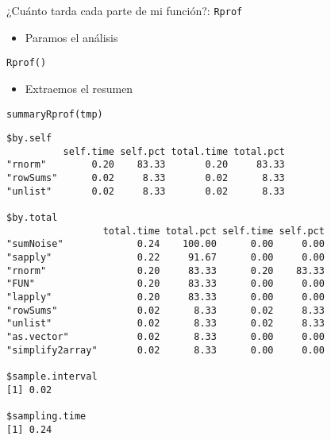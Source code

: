 \documentclass[xcolor={usenames,svgnames,dvipsnames}]{beamer}
\begin{document}
\begin{frame}[fragile,label={sec:orgheadline26}]{¿Cuánto tarda cada parte de mi función?: \texttt{Rprof}}
 \begin{itemize}
\item Paramos el análisis
\end{itemize}
\lstset{language=R,label= ,caption= ,captionpos=b,numbers=none}
\begin{lstlisting}
Rprof()
\end{lstlisting}

\begin{itemize}
\item Extraemos el resumen
\end{itemize}
\lstset{language=R,label= ,caption= ,captionpos=b,numbers=none}
\begin{lstlisting}
summaryRprof(tmp)
\end{lstlisting}

\begin{verbatim}
$by.self
          self.time self.pct total.time total.pct
"rnorm"        0.20    83.33       0.20     83.33
"rowSums"      0.02     8.33       0.02      8.33
"unlist"       0.02     8.33       0.02      8.33

$by.total
                 total.time total.pct self.time self.pct
"sumNoise"             0.24    100.00      0.00     0.00
"sapply"               0.22     91.67      0.00     0.00
"rnorm"                0.20     83.33      0.20    83.33
"FUN"                  0.20     83.33      0.00     0.00
"lapply"               0.20     83.33      0.00     0.00
"rowSums"              0.02      8.33      0.02     8.33
"unlist"               0.02      8.33      0.02     8.33
"as.vector"            0.02      8.33      0.00     0.00
"simplify2array"       0.02      8.33      0.00     0.00

$sample.interval
[1] 0.02

$sampling.time
[1] 0.24
\end{verbatim}
\end{frame}
\end{document}
